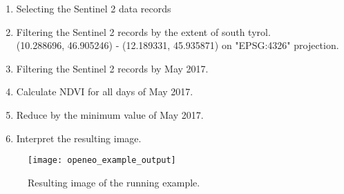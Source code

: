 \documentclass[draft,final]{vutinfth} %
\begin{document}
\begin{enumerate}
	\item Selecting the Sentinel 2 data records
	\item Filtering the Sentinel 2 records by the extent of south tyrol. \\(10.288696, 46.905246) - (12.189331, 45.935871) on "EPSG:4326" projection.
	\item Filtering the Sentinel 2 records by May 2017.
	\item Calculate NDVI for all days of May 2017.
	\item Reduce by the minimum value of May 2017.
	\item Interpret the resulting image.
\end{enumerate}

\begin{figure}[h]
	\centering
	\texttt{[image: openeo\_example\_output]}
	\caption{Resulting image of the running example.}
	\label{fig:example} %
\end{figure}
\end{document}
